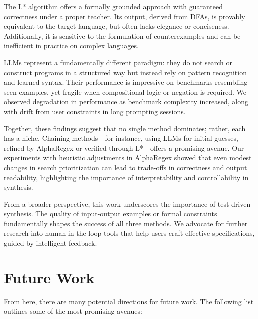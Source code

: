 \indent\indent The L* algorithm offers a formally grounded approach with guaranteed correctness under a proper teacher. Its output, derived from DFAs, is provably equivalent to the target language, but often lacks elegance or conciseness. Additionally, it is sensitive to the formulation of counterexamples and can be inefficient in practice on complex languages.

\indent\indent LLMs represent a fundamentally different paradigm: they do not search or construct programs in a structured way but instead rely on pattern recognition and learned syntax. Their performance is impressive on benchmarks resembling seen examples, yet fragile when compositional logic or negation is required. We observed degradation in performance as benchmark complexity increased, along with drift from user constraints in long prompting sessions.

\indent\indent Together, these findings suggest that no single method dominates; rather, each has a niche. Chaining methods—for instance, using LLMs for initial guesses, refined by AlphaRegex or verified through L*—offers a promising avenue. Our experiments with heuristic adjustments in AlphaRegex showed that even modest changes in search prioritization can lead to trade-offs in correctness and output readability, highlighting the importance of interpretability and controllability in synthesis.

\indent\indent From a broader perspective, this work underscores the importance of test-driven synthesis. The quality of input-output examples or formal constraints fundamentally shapes the success of all three methods. We advocate for further research into human-in-the-loop tools that help users craft effective specifications, guided by intelligent feedback.

\section{Future Work}

\indent\indent From here, there are many potential directions for future work. The following list outlines some of the most promising avenues:

